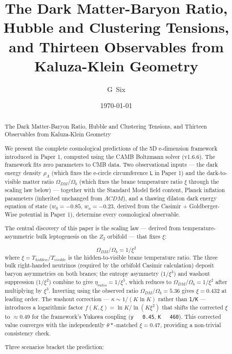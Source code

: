 \documentclass[aps,prd,preprint,superscriptaddress,longbibliography]{revtex4-2}
\begin{document}
\title{The Dark Matter-Baryon Ratio, Hubble and Clustering Tensions, and Thirteen Observables from Kaluza-Klein Geometry}
\author{G~Six}
\date{\today}

\begin{abstract}
The Dark Matter-Baryon Ratio, Hubble and Clustering Tensions, and Thirteen Observables from Kaluza-Klein Geometry


We present the complete cosmological predictions of the 5D e-dimension framework introduced in Paper 1, computed using the CAMB Boltzmann solver (v1.6.6). The framework fits zero parameters to CMB data. Two observational inputs --- the dark energy density $\rho_\Lambda$ (which fixes the e-circle circumference \texttt{L} in Paper 1) and the dark-to-visible matter ratio $\Omega_{DM}/\Omega_b$ (which fixes the brane temperature ratio $\xi$ through the scaling law below) --- together with the Standard Model field content, Planck inflation parameters (inherited unchanged from $\Lambda CDM$), and a thawing dilaton dark energy equation of state ($w_{0} = -0.85$, $w_a = -0.23$, derived from the Casimir + Goldberger-Wise potential in Paper 1), determine every cosmological observable.

The central discovery of this paper is the scaling law --- derived from temperature-asymmetric bulk leptogenesis on the $Z_{2}$ orbifold --- that fixes $\xi$:


\begin{equation}
    \Omega_{DM} / \Omega_b = 1/\xi^{2}
\end{equation}
where $\xi = T_{hidden}/T_{visible}$ is the hidden-to-visible brane temperature ratio. The three bulk right-handed neutrinos (required by the orbifold Casimir calculation) deposit baryon asymmetries on both branes; the entropy asymmetry ($1/\xi^{3}$) and washout suppression ($1/\xi^{2}$) combine to give $\eta_{ratio} = 1/\xi^{5}$, which reduces to $\Omega_{DM}/\Omega_b = 1/\xi^{2}$ after multiplying by $\xi^{3}$. Inverting using the observed ratio $\Omega_{DM}/\Omega_b = 5.36$ gives $\xi = 0.432$ at leading order. The washout correction --- $\kappa \sim  1/(K \ln K)$ rather than \texttt{1/K} --- introduces a logarithmic factor $f(K,\xi) = \ln K / \ln(K\xi^{2})$ that shifts the corrected $\xi$ to $\approx 0.49$ for the framework's Yukawa coupling (\texttt{y ~ 0.45}, \texttt{K ~ 460}). This corrected value converges with the independently $\theta*$-matched $\xi = 0.47$, providing a non-trivial consistency check.

Three scenarios bracket the prediction:



\end{abstract}
\end{document}
